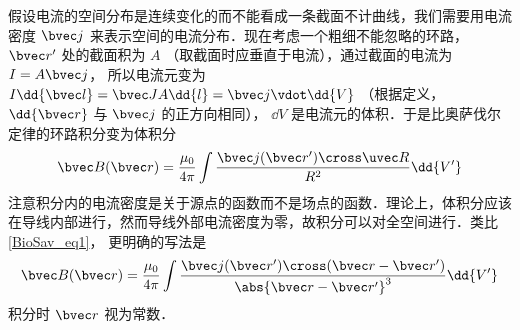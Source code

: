 假设电流的空间分布是连续变化的而不能看成一条截面不计曲线，我们需要用电流密度 $\bvec j$ 来表示空间的电流分布．现在考虑一个粗细不能忽略的环路， $\bvec r'$ 处的截面积为 $A$ （取截面时应垂直于电流），通过截面的电流为 $I = A\bvec j$， 所以电流元变为 $I \dd{\bvec l} = \bvec JA \dd{l} = \bvec j \vdot \dd{V}$ （根据定义， $\dd{\bvec r}$ 与 $\bvec j$ 的正方向相同）， $\dd{V}$ 是电流元的体积．于是比奥萨伐尔定律的环路积分变为体积分
\begin{equation}
\bvec B(\bvec r) = \frac{\mu_0}{4\pi} \int \frac{\bvec j(\bvec r') \cross \uvec R}{R^2}\dd{V'}
\end{equation}
注意积分内的电流密度是关于源点的函数而不是场点的函数．理论上，体积分应该在导线内部进行，然而导线外部电流密度为零，故积分可以对全空间进行．类比\autoref{BioSav_eq1}， 更明确的写法是
\begin{equation}
\bvec B(\bvec r) = \frac{\mu_0}{4\pi} \int \frac{\bvec j(\bvec r') \cross (\bvec r - \bvec r')}{\abs{\bvec r - \bvec r'}^3} \dd{V'}
\end{equation}
积分时 $\bvec r$ 视为常数．
